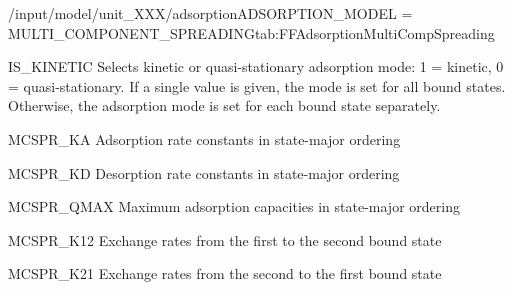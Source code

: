 \begin{condsubgroup}{/input/model/unit\_XXX/adsorption}{ADSORPTION\_MODEL = MULTI\_COMPONENT\_SPREADING}{tab:FFAdsorptionMultiCompSpreading}
\begin{dataset}[type=int,range={$\{ 0,1 \}$},length={1 / \texttt{NTOTALBND}}]{IS\_KINETIC}
    Selects kinetic or quasi-stationary adsorption mode: 1 = kinetic, 0 = quasi-stationary.
    If a single value is given, the mode is set for all bound states.
    Otherwise, the adsorption mode is set for each bound state separately.
  \end{dataset}
  \begin{dataset}[unit=\si{\cubic\metre\of{MP}\per\mol\per\second}, type = double, range={$\geq 0$}, length={\texttt{NTOTALBND}}]{MCSPR\_KA} 
    Adsorption rate constants in state-major ordering   
  \end{dataset}  
  \begin{dataset}[unit=\si{\per\second}, type = double, range={$\geq 0$}, length={\texttt{NTOTALBND}}]{MCSPR\_KD} 
    Desorption rate constants in state-major ordering  
  \end{dataset}  
  \begin{dataset}[unit=\si{\mol\per\cubic\metre\of{SP}}, type = double, range={$> 0$}, length={\texttt{NTOTALBND}}]{MCSPR\_QMAX} 
    Maximum adsorption capacities in state-major ordering  
  \end{dataset}  
  \begin{dataset}[unit=\si{\per\second}, type = double, range={$\geq 0$}, length={\texttt{NCOMP}}]{MCSPR\_K12} 
    Exchange rates from the first to the second bound state 
  \end{dataset}  
  \begin{dataset}[unit=\si{\per\second}, type = double, range={$\geq 0$}, length={\texttt{NCOMP}}]{MCSPR\_K21} 
    Exchange rates from the second to the first bound state 
  \end{dataset}  
\end{condsubgroup}

